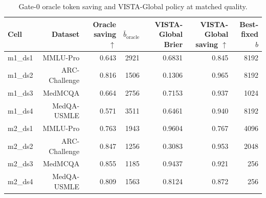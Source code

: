 \begin{table}[ht]
\centering
\small
\begin{tabular}{lrrrrrr}
\toprule
Cell & Dataset & Oracle saving $\uparrow$ & $\bar{b}_{\text{oracle}}$ & VISTA-Global Brier & VISTA-Global saving $\uparrow$ & Best-fixed $b$ \\
\midrule
m1\_ds1 & MMLU-Pro & 0.643 & 2921 & 0.6831 & 0.845 & 8192 \\
m1\_ds2 & ARC-Challenge & 0.816 & 1506 & 0.1306 & 0.965 & 8192 \\
m1\_ds3 & MedMCQA & 0.664 & 2756 & 0.7153 & 0.937 & 1024 \\
m1\_ds4 & MedQA-USMLE & 0.571 & 3511 & 0.6461 & 0.940 & 8192 \\
m2\_ds1 & MMLU-Pro & 0.763 & 1943 & 0.9604 & 0.767 & 4096 \\
m2\_ds2 & ARC-Challenge & 0.847 & 1256 & 0.3083 & 0.953 & 2048 \\
m2\_ds3 & MedMCQA & 0.855 & 1185 & 0.9437 & 0.921 & 256 \\
m2\_ds4 & MedQA-USMLE & 0.809 & 1563 & 0.8124 & 0.872 & 256 \\
\bottomrule
\end{tabular}
\caption{Gate-0 oracle token saving and VISTA-Global policy at matched quality.}
\label{tab:a08_global_adaptive}
\end{table}